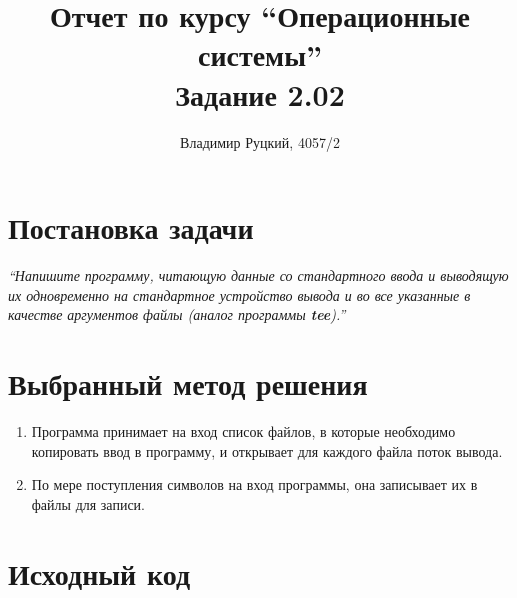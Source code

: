 \documentclass[a4paper,12pt]{article}
\title{Отчет по курсу ``Операционные системы'' \\ Задание 2.02}
\author{Владимир Руцкий, 4057/2}
\newcommand{\commandquote}[1]{\textbf{#1}}
\begin{document}
\maketitle

\section*{Постановка задачи}
\textit{``Напишите программу, читающую данные со стандартного ввода и выводящую
их одновременно на стандартное устройство вывода и во все указанные в
качестве аргументов файлы (аналог программы \commandquote{tee}).''}

\section*{Выбранный метод решения}
\begin{enumerate}
 \item Программа принимает на вход список файлов, в которые необходимо копировать ввод в программу,
и открывает для каждого файла поток вывода.
 \item По мере поступления символов на вход программы, она записывает их в файлы для записи.
\end{enumerate}

\section*{Исходный код}
\lstset{language=bash, caption=task\_2\_02.c,%
label=source-code, basicstyle=\footnotesize,%
numbers=left, numberstyle=\footnotesize, numbersep=5pt, frame=single, breaklines=true, breakatwhitespace=false,%
inputencoding=utf8x}

\end{document}
